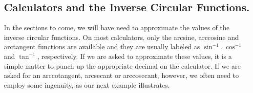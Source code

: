 \subsection{Calculators and the Inverse Circular Functions.}
\label{sectionarcstuffoncalc}

In the sections to come, we will have need to approximate the values of the inverse circular functions.  On most calculators, only the arcsine, arccosine and arctangent functions are available and they are usually labeled as $\sin^{-1}, \cos^{-1}$ and $\tan^{-1}$, respectively.  If we are asked to approximate these values, it is a simple matter to punch up the appropriate decimal on the calculator.  If we are asked for an arccotangent, arcsecant or arccosecant, however, we often need to employ some ingenuity, as our next example illustrates.

